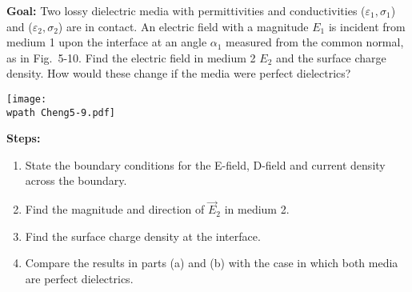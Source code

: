 \documentclass[../../header.tex]{subfiles}
\begin{document}
\textbf{Goal:} Two lossy dielectric media with permittivities and conductivities ($\varepsilon_1, \sigma_1$) and ($\varepsilon_2, \sigma_2$) are in contact. An electric field with a magnitude $E_1$ is incident from medium 1 upon the interface at an angle $\alpha_1$ measured from the common normal, as in Fig.~5-10. Find the electric field in medium 2 $E_2$ and the surface charge density. How would these change if the media were perfect dielectrics?
\begin{center}
\texttt{[image: \\wpath Cheng5-9.pdf]}
\end{center}
\textbf{Steps:} 
\begin{enumerate}
\item State the boundary conditions for the E-field, D-field and current density across the boundary.\\

\item Find the magnitude and direction of $\vec{E}_2$ in medium 2.\\

\item Find the surface charge density at the interface.\\

\item Compare the results in parts (a) and (b) with the case in which both media are perfect dielectrics.\\

\end{enumerate}
\end{document}
